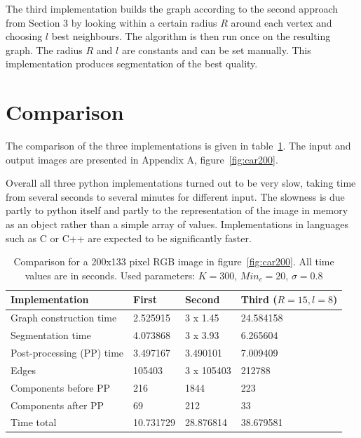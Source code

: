 The third implementation builds the graph according to the second approach from Section 3 by looking within a certain radius $R$ around each 
vertex and choosing $l$ best neighbours. The algorithm is then run once on the resulting graph. The radius $R$ and $l$ are constants and can 
be set manually.
This implementation produces segmentation of the best quality.

\section{Comparison}
The comparison of the three implementations is given in table~\ref{table1}. The input and output images are presented in Appendix A, figure~\ref{fig:car200}.

Overall all three python implementations turned out to be very slow, taking time from several seconds to several minutes for different input.
The slowness is due partly to python itself and partly to the representation of the image in memory as an object rather than a simple array
of values. Implementations in languages such as C or C++ are expected to be significantly faster.



\begin{table}[h]
    \begin{tabular}{| l | l | l | l |}
    \hline
Implementation              &   First     & Second       & Third ($R = 15, l = 8$) \\ \hline
Graph construction time     &   2.525915  & 3 x 1.45     & 24.584158 \\
Segmentation time           &   4.073868  & 3 x 3.93     & 6.265604 \\
Post-processing (PP) time   &   3.497167  & 3.490101     & 7.009409 \\
Edges                       &   105403    & 3 x 105403   & 212788 \\
Components before PP        &   216       & 1844         & 223 \\
Components after PP         &   69        & 212          & 33 \\ \hline
Time total                  &   10.731729 & 28.876814    & 38.679581 \\ 
    \hline
    \end{tabular}

    \caption{Comparison for a 200x133 pixel RGB image in figure~\ref{fig:car200}. All time values are in seconds. 
             Used parameters: $K = 300$, $Min_c = 20$, $\sigma = 0.8$ }
    \label{table1}
\end{table}


